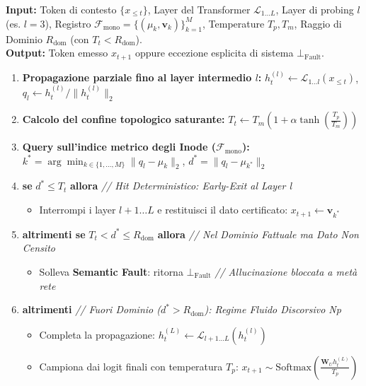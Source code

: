 \documentclass[11pt,a4paper]{article}
\theoremstyle{definition}
\begin{document}
\begin{tcolorbox}[top=4pt, bottom=4pt, title={\small \textbf{Algoritmo 1: Forward Pass Unificato con Gating Geometrico al Layer Intermedio e Early-Exit}}]
\small
\textbf{Input:} Token di contesto $\{x_{\le t}\}$, Layer del Transformer $\mathcal{L}_{1 \dots L}$, Layer di probing $l$ (es. $l=3$), Registro $\mathcal{F}_{\mathrm{mono}} = \{(\mu_k, \mathbf{v}_k)\}_{k=1}^M$, Temperature $T_p, T_m$, Raggio di Dominio $R_{\mathrm{dom}}$ (con $T_t < R_{\mathrm{dom}}$). \\
\textbf{Output:} Token emesso $x_{t+1}$ oppure eccezione esplicita di sistema $\bot_{\mathrm{Fault}}$.
\begin{enumerate}[leftmargin=*, itemsep=1.0pt, topsep=1.0pt]
    \item \textbf{Propagazione parziale fino al layer intermedio $l$:}
    $h_t^{(l)} \leftarrow \mathcal{L}_{1 \dots l}(x_{\le t})$, \quad $q_l \leftarrow h_t^{(l)} / \|h_t^{(l)}\|_2$
    \item \textbf{Calcolo del confine topologico saturante:}
    $T_t \leftarrow T_m \left( 1 + \alpha \tanh\left(\frac{T_p}{T_m}\right) \right)$
    \item \textbf{Query sull'indice metrico degli Inode ($\mathcal{F}_{\mathrm{mono}}$):}
    $k^* = \arg\min_{k \in \{1, \dots, M\}} \|q_l - \mu_k\|_2$, \quad $d^* = \|q_l - \mu_{k^*}\|_2$
    \item \textbf{se} $d^* \le T_t$ \textbf{allora} \hfill \textit{// Hit Deterministico: Early-Exit al Layer l}
    \begin{itemize}[leftmargin=14pt, itemsep=0.5pt, topsep=0.5pt]
        \item Interrompi i layer $l+1 \dots L$ e restituisci il dato certificato: $x_{t+1} \leftarrow \mathbf{v}_{k^*}$
    \end{itemize}
    \item \textbf{altrimenti se} $T_t < d^* \le R_{\mathrm{dom}}$ \textbf{allora} \hfill \textit{// Nel Dominio Fattuale ma Dato Non Censito}
    \begin{itemize}[leftmargin=14pt, itemsep=0.5pt, topsep=0.5pt]
        \item Solleva \textbf{Semantic Fault}: ritorna $\bot_{\mathrm{Fault}}$ \hfill \textit{// Allucinazione bloccata a metà rete}
    \end{itemize}
    \item \textbf{altrimenti} \hfill \textit{// Fuori Dominio ($d^* > R_{\mathrm{dom}}$): Regime Fluido Discorsivo Np}
    \begin{itemize}[leftmargin=14pt, itemsep=0.5pt, topsep=0.5pt]
        \item Completa la propagazione: $h_t^{(L)} \leftarrow \mathcal{L}_{l+1 \dots L}(h_t^{(l)})$
        \item Campiona dai logit finali con temperatura $T_p$: $x_{t+1} \sim \mathrm{Softmax}\left(\frac{\mathbf{W}_U h_t^{(L)}}{T_p}\right)$
    \end{itemize}
\end{enumerate}
\end{tcolorbox}
\end{document}
